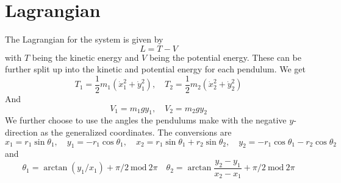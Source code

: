 \documentclass[a4paper,11pt]{article}
\begin{document}
	\section{Lagrangian}
	The Lagrangian for the system is given by
	\begin{equation}\label{key}
		L = T - V
	\end{equation}
	with $ T $ being the kinetic energy and $ V $ being the potential energy. These can be further split up into the kinetic and potential energy for each pendulum. We get
	\begin{equation}\label{key}
		T_1 = \frac{1}{2} m_1 (\dot{x}_1^2 + \dot{y}_1^2), \quad T_2 = \frac{1}{2} m_2 (\dot{x}_2^2 + \dot{y}_2^2)
	\end{equation}
	And
	\begin{equation}\label{key}
		V_1 = m_1 g y_1, \quad V_2 = m_2 g y_2
	\end{equation}
	We further choose to use the angles the pendulums make with the negative $ y $-direction as the generalized coordinates. The conversions are
	\begin{equation}\label{key}
		x_1 = r_1 \sin \theta_1, \quad y_1 = -r_1 \cos \theta_1, \quad x_2 = r_1 \sin \theta_1 + r_2 \sin \theta_2, \quad y_2 = -r_1 \cos \theta_1 - r_2 \cos \theta_2
	\end{equation}
	and
	\begin{equation}\label{key}
		\theta_1 = \arctan(y_1/x_1) + \pi/2\ \text{mod}\ 2\pi\quad  \theta_2 = \arctan\frac{y_2-y_1}{x_2-x_1} + \pi/2 \ \text{mod}\ 2\pi 
	\end{equation}
\end{document}
